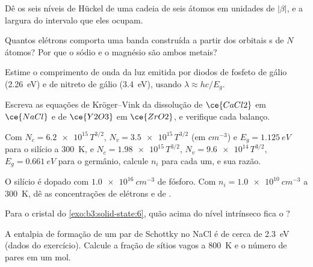 \begin{exercise}[$\star$]\label{exo:b3:solid-state:1}
Dê os seis níveis de Hückel de uma cadeia de seis átomos em unidades de $|\beta|$, e a
largura do intervalo que eles ocupam.
\end{exercise}

\begin{exercise}[$\star$]\label{exo:b3:solid-state:2}
Quantos elétrons comporta uma banda construída a partir dos orbitais s de $N$ átomos? Por que
o sódio e o magnésio são ambos metais?
\end{exercise}

\begin{exercise}[$\star$]\label{exo:b3:solid-state:3}
Estime o comprimento de onda da luz emitida por diodos de fosfeto de gálio
(\qty{2.26}{eV}) e de nitreto de gálio (\qty{3.4}{eV}), usando $\lambda \approx hc/E_g$.
\end{exercise}

\begin{exercise}[$\star$]\label{exo:b3:solid-state:4}
Escreva as equações de Kröger--Vink da dissolução de $\ce{CaCl2}$ em $\ce{NaCl}$ e de $\ce{Y2O3}$ em $\ce{ZrO2}$, e
verifique cada balanço.
\end{exercise}

\begin{exercise}[$\star\star$]\label{exo:b3:solid-state:5}
Com $N_c = \num{6.2e15}\,T^{3/2}$, $N_v = \num{3.5e15}\,T^{3/2}$ (em $\unit{cm^{-3}}$) e $E_g = \qty{1.125}{eV}$ para o silício a \qty{300}{K},
e $N_c = \num{1.98e15}\,T^{3/2}$, $N_v = \num{9.6e14}\,T^{3/2}$, $E_g = \qty{0.661}{eV}$ para o germânio, calcule $n_i$ para cada um, e sua
razão.
\end{exercise}

\begin{exercise}[$\star\star$]\label{exo:b3:solid-state:6}
O silício é dopado com $\qty{1.0e16}{cm^{-3}}$ de fósforo. Com $n_i = \qty{1.0e10}{cm^{-3}}$ a \qty{300}{K}, dê as
concentrações de elétrons e de .
\end{exercise}

\begin{exercise}[$\star\star$]\label{exo:b3:solid-state:7}
Para o cristal do \cref{exo:b3:solid-state:6}, quão acima do nível intrínseco fica
o ?
\end{exercise}

\begin{exercise}[$\star\star$]\label{exo:b3:solid-state:8}
A entalpia de formação de um par de Schottky no NaCl é de cerca de \qty{2.3}{eV} (dados do
exercício). Calcule a fração de sítios vagos a \qty{800}{K} e o número de
pares em um mol.
\end{exercise}

